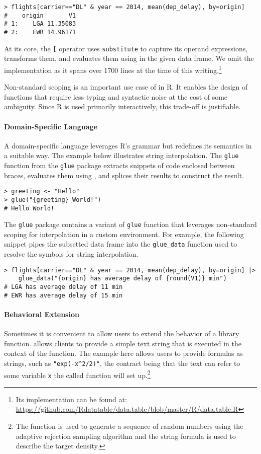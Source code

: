 \documentclass[acmsmall, screen]{acmart}
\renewcommand{\k}[1]{\lstinline |#1|\xspace}
\begin{document}
\begin{lstlisting}[title={\k{data.table::[}}, captionpos=b]
> flights[carrier=="DL" & year == 2014, mean(dep_delay), by=origin]
#    origin       V1
# 1:    LGA 11.35083
# 2:    EWR 14.96171
\end{lstlisting}\medskip

At its core, the \k{[} operator uses \k{substitute} to capture its operand
expressions, transforms them, and evaluates them using \eval in the given data
frame. We omit the implementation as it spans over 1700 lines at the time of
this writing.\footnote{Its implementation can be found at:
  \url{https://github.com/Rdatatable/data.table/blob/master/R/data.table.R}}

Non-standard scoping is an important use case of \eval in R. It enables the
design of functions that require less typing and syntactic noise at the cost of
some ambiguity. Since R is used primarily interactively, this trade-off is
justifiable.

\paragraph{Domain-Specific Language} A domain-specific language leverages R's
grammar but redefines its semantics in a suitable way. The example below
illustrates string interpolation. The \k{glue} function from the \k{glue}
package extracts snippets of code enclosed between braces, evaluates them using
\eval, and splices their results to construct the result.

\begin{lstlisting}[title={\k{glue::glue}}, captionpos=b]
> greeting <- "Hello"
> glue("{greeting} World!")
# Hello World!
\end{lstlisting}\medskip

The \k{glue} package contains a variant of \k{glue} function that leverages
non-standard scoping for interpolation in a custom environment. For example,
the following snippet pipes the subsetted data frame into the \k{glue_data}
function used to resolve the symbols for string interpolation.


\begin{lstlisting}[title={\k{glue::glue_data}}, captionpos=b]
> flights[carrier=="DL" & year == 2014, mean(dep_delay), by=origin] |>
    glue_data("{origin} has average delay of {round(V1)} min")
# LGA has average delay of 11 min
# EWR has average delay of 15 min
\end{lstlisting}

\paragraph{Behavioral Extension} Sometimes it is convenient to allow users to
extend the behavior of a library function. \Eval allows clients to provide a
simple text string that is executed in the context of the function. The example
here allows users to provide formulas as strings, such as \k{"exp(-x^2/2)"},
the contract being that the text can refer to some variable \k{x} the called
function will set up.\footnote{The function is used to generate a sequence of
  random numbers using the adaptive rejection sampling algorithm and the string
formula is used to describe the target density.}
\end{document}
